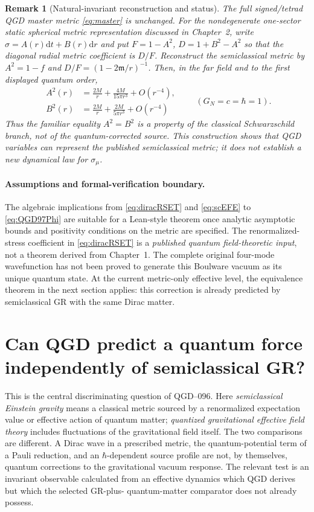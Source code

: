 \documentclass[11pt,a4paper]{article}
\newtheorem{remark}[theorem]{Remark}
\newcommand{\dd}{\mathrm d}
\begin{document}
\begin{remark}[Natural-invariant reconstruction and status]
The full signed/tetrad QGD master metric \eqref{eq:master} is
unchanged.  For the nondegenerate one-sector static spherical
\emph{metric representation} discussed in Chapter~2, write
$\sigma=A(r)\dd t+B(r)\dd r$ and put
$F=1-A^2$, $D=1+B^2-A^2$ so that the diagonal radial metric
coefficient is $D/F$.  Reconstruct the semiclassical metric by
$A^2=1-f$ and $D/F=(1-2\mathfrak m/r)^{-1}$.
Then, in the far field and to the first displayed quantum order,
\begin{equation}\label{eq:scsigmaAB}
\boxed{\begin{aligned}
A^2(r)&=\frac{2M}{r}+\frac{4M}{15\pi r^3}
+O(r^{-4}),\\
B^2(r)&=\frac{2M}{r}+\frac{2M}{5\pi r^3}
+O(r^{-4})
\end{aligned}}
\qquad(G_N=c=\hbar=1).
\end{equation}
Thus the familiar equality $A^2=B^2$ is a property of the
classical Schwarzschild branch, \emph{not} of the quantum-corrected
source.  This construction shows that QGD variables can
represent the published semiclassical metric; it does not
establish a new dynamical law for $\sigma_\mu$.
\end{remark}

\paragraph{Assumptions and formal-verification boundary.}
The algebraic implications from \eqref{eq:diracRSET} and
\eqref{eq:scEFE} to \eqref{eq:QGD97Phi} are suitable for a
Lean-style theorem once analytic asymptotic bounds and positivity
conditions on the metric are specified.  The renormalized-stress
coefficient in \eqref{eq:diracRSET} is a \emph{published quantum
field-theoretic input}, not a theorem derived from Chapter~1.
The complete original four-mode wavefunction has not been proved
to generate this Boulware vacuum as its unique quantum state.
At the current metric-only effective level, the equivalence theorem
in the next section applies: this correction is already predicted
by semiclassical GR with the same Dirac matter.


\section{Can QGD predict a quantum force independently of semiclassical GR?}
\label{sec:independent}
This is the central discriminating question of QGD--096. Here
\emph{semiclassical Einstein gravity} means a classical metric sourced by
a renormalized expectation value or effective action of quantum matter;
\emph{quantized gravitational effective field theory} includes
fluctuations of the gravitational field itself. The two comparisons are
different. A Dirac wave in a prescribed metric, the quantum-potential
term of a Pauli reduction, and an $\hbar$-dependent source profile are
not, by themselves, quantum corrections to the gravitational vacuum
response. The relevant test is an invariant observable calculated from
an effective dynamics which QGD derives but which the selected GR-plus-
quantum-matter comparator does not already possess.
\end{document}
